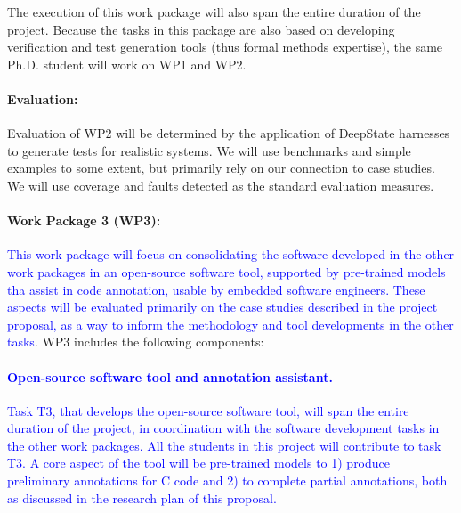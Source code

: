 The execution of this work package will also span the entire duration of the project.
Because the tasks in this package are also based on developing
verification and test generation tools (thus formal methods
expertise), the same Ph.D. student will work on WP1 and WP2. 

\paragraph{Evaluation:} Evaluation of
WP2 will be determined by the application
of DeepState harnesses to generate tests for realistic
systems.  We will use benchmarks and simple examples to some
extent, but primarily rely on our connection to case studies.
We will use coverage and faults
detected as the standard evaluation  measures.

\paragraph{Work Package 3 (WP3):}
\textcolor{blue}{%
This work package will focus on consolidating the software developed
in the other work packages in an open-source software tool, supported
by pre-trained models tha assist in code annotation, usable by embedded
software engineers.  These aspects will be evaluated primarily on the
case studies described in the project proposal, as a way to inform the methodology and tool developments in the other tasks}.
WP3 includes the following components:
\textcolor{blue}{%
\paragraph{Open-source software tool and annotation assistant.}
Task T3, that develops the open-source software tool, will span the
entire duration of the project, in coordination with the software
development tasks in the other work packages.  All the students in
this project will contribute to task T3.  A core aspect of the tool
will be pre-trained models to 1) produce preliminary annotations for C
code and 2) to complete partial annotations, both as discussed in the
research plan of this proposal.}


